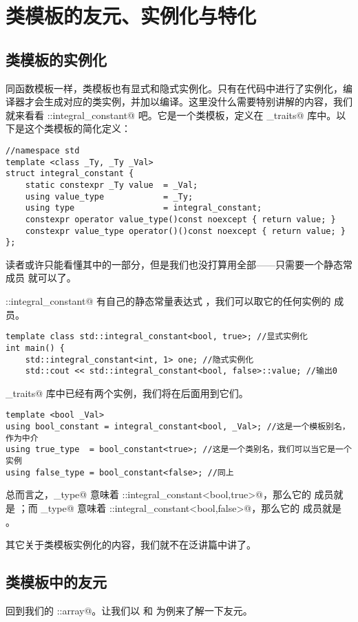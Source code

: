 \section{类模板的友元、实例化与特化}
\subsection*{类模板的实例化}
同函数模板一样，类模板也有显式和隐式实例化。只有在代码中进行了实例化，编译器才会生成对应的类实例，并加以编译。这里没什么需要特别讲解的内容，我们就来看看 \lstinline@std::integral_constant@ 吧。它是一个类模板，定义在 \lstinline@type_traits@ 库中。以下是这个类模板的简化定义：
\begin{lstlisting}
//namespace std
template <class _Ty, _Ty _Val>
struct integral_constant {
    static constexpr _Ty value  = _Val;
    using value_type            = _Ty;
    using type                  = integral_constant;
    constexpr operator value_type()const noexcept { return value; }
    constexpr value_type operator()()const noexcept { return value; }
};
\end{lstlisting}
读者或许只能看懂其中的一部分，但是我们也没打算用全部——只需要一个静态常成员 \lstinline@value@ 就可以了。\par
\lstinline@std::integral_constant@ 有自己的静态常量表达式 \lstinline@value@，我们可以取它的任何实例的 \lstinline@value@ 成员。
\begin{lstlisting}
template class std::integral_constant<bool, true>; //显式实例化
int main() {
    std::integral_constant<int, 1> one; //隐式实例化
    std::cout << std::integral_constant<bool, false>::value; //输出0
\end{lstlisting}
\lstinline@type_traits@ 库中已经有两个实例，我们将在后面用到它们。
\begin{lstlisting}
template <bool _Val>
using bool_constant = integral_constant<bool, _Val>; //这是一个模板别名，作为中介
using true_type  = bool_constant<true>; //这是一个类别名，我们可以当它是一个实例
using false_type = bool_constant<false>; //同上
\end{lstlisting}
总而言之，\lstinline@true_type@ 意味着 \lstinline@std::integral_constant<bool,true>@，那么它的 \lstinline@value@ 成员就是 \lstinline@true@；而 \lstinline@false_type@ 意味着 \lstinline@std::integral_constant<bool,false>@，那么它的 \lstinline@value@ 成员就是 \lstinline@false@。\par
其它关于类模板实例化的内容，我们就不在泛讲篇中讲了。\par
\subsection*{类模板中的友元}
回到我们的 \lstinline@user::array@。让我们以 \lstinline@get@ 和 \lstinline@swap@ 为例来了解一下友元。\par
